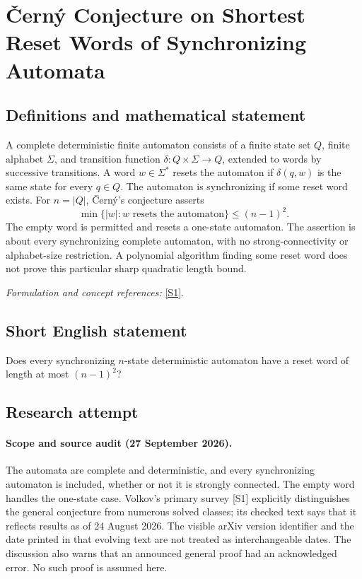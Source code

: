 \documentclass[11pt]{article}
\begin{document}
\section*{\texorpdfstring{Černý Conjecture on Shortest Reset Words of Synchronizing Automata}{Černý Conjecture on Shortest Reset Words of Synchronizing Automata}}\label{378}
\subsection{Definitions and mathematical statement}
A complete deterministic finite automaton consists of a finite state set $Q$, finite alphabet $\Sigma$, and transition function $\delta:Q\times\Sigma\to Q$, extended to words by successive transitions. A word $w\in\Sigma^*$ resets the automaton if $\delta(q,w)$ is the same state for every $q\in Q$. The automaton is synchronizing if some reset word exists. For $n=|Q|$, \v{C}ern\'y's conjecture asserts
\[
 \min\{|w|:w\text{ resets the automaton}\}\le(n-1)^2.
\]
The empty word is permitted and resets a one-state automaton. The assertion is about every synchronizing complete automaton, with no strong-connectivity or alphabet-size restriction. A polynomial algorithm finding some reset word does not prove this particular sharp quadratic length bound.
\par\smallskip\textit{Formulation and concept references:} \href{https://arxiv.org/html/2508.15655}{[S1]}.

\subsection{Short English statement}
Does every synchronizing $n$-state deterministic automaton have a reset word of length at most $(n-1)^2$?
\subsection{Research attempt}
\paragraph{Scope and source audit (27 September 2026).}
The automata are complete and deterministic, and every synchronizing automaton is included, whether or not it is strongly connected. The empty word handles the one-state case. Volkov's primary survey [S1] explicitly distinguishes the general conjecture from numerous solved classes; its checked text says that it reflects results as of 24 August 2026. The visible arXiv version identifier and the date printed in that evolving text are not treated as interchangeable dates. The discussion also warns that an announced general proof had an acknowledged error. No such proof is assumed here.
\end{document}
